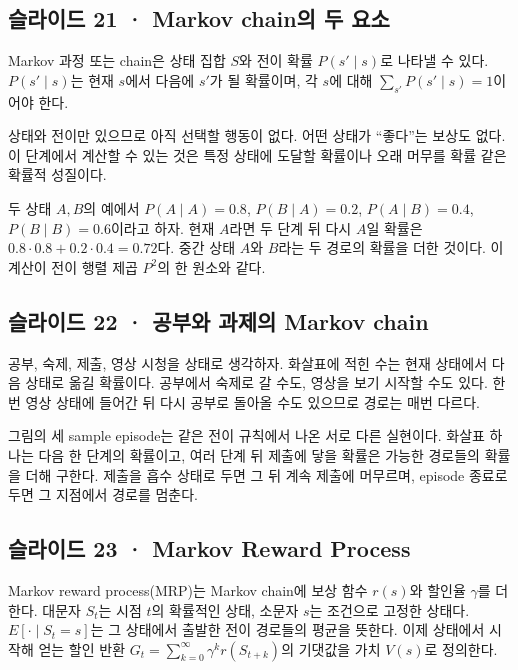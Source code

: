\documentclass[11pt,a4paper]{article}
\begin{document}
\subsection{슬라이드 21 · Markov chain의 두 요소}

Markov 과정 또는 chain은 상태 집합 $S$와 전이 확률 $P(s'\mid s)$로 나타낼 수 있다. $P(s'\mid s)$는 현재 $s$에서 다음에 $s'$가 될 확률이며, 각 $s$에 대해 $\sum_{s'}P(s'\mid s)=1$이어야 한다.\par

상태와 전이만 있으므로 아직 선택할 행동이 없다. 어떤 상태가 “좋다”는 보상도 없다. 이 단계에서 계산할 수 있는 것은 특정 상태에 도달할 확률이나 오래 머무를 확률 같은 확률적 성질이다.\par

두 상태 $A,B$의 예에서 $P(A\mid A)=0.8$, $P(B\mid A)=0.2$, $P(A\mid B)=0.4$, $P(B\mid B)=0.6$이라고 하자. 현재 $A$라면 두 단계 뒤 다시 $A$일 확률은 $0.8\cdot0.8+0.2\cdot0.4=0.72$다. 중간 상태 $A$와 $B$라는 두 경로의 확률을 더한 것이다. 이 계산이 전이 행렬 제곱 $P^2$의 한 원소와 같다.\par

\subsection{슬라이드 22 · 공부와 과제의 Markov chain}

공부, 숙제, 제출, 영상 시청을 상태로 생각하자. 화살표에 적힌 수는 현재 상태에서 다음 상태로 옮길 확률이다. 공부에서 숙제로 갈 수도, 영상을 보기 시작할 수도 있다. 한 번 영상 상태에 들어간 뒤 다시 공부로 돌아올 수도 있으므로 경로는 매번 다르다.\par

그림의 세 sample episode는 같은 전이 규칙에서 나온 서로 다른 실현이다. 화살표 하나는 다음 한 단계의 확률이고, 여러 단계 뒤 제출에 닿을 확률은 가능한 경로들의 확률을 더해 구한다. 제출을 흡수 상태로 두면 그 뒤 계속 제출에 머무르며, episode 종료로 두면 그 지점에서 경로를 멈춘다.\par

\subsection{슬라이드 23 · Markov Reward Process}

Markov reward process(MRP)는 Markov chain에 보상 함수 $r(s)$와 할인율 $\gamma$를 더한다. 대문자 $S_t$는 시점 $t$의 확률적인 상태, 소문자 $s$는 조건으로 고정한 상태다. $E[\cdot\mid S_t=s]$는 그 상태에서 출발한 전이 경로들의 평균을 뜻한다. 이제 상태에서 시작해 얻는 할인 반환 $G_t=\sum_{k=0}^{\infty}\gamma^k r(S_{t+k})$의 기댓값을 가치 $V(s)$로 정의한다.\par
\end{document}
